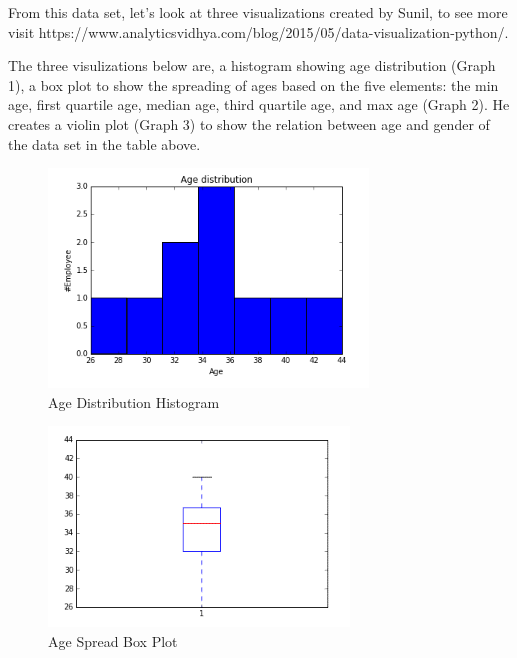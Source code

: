 \documentclass[sigconf]{acmart}
\begin{document}
From this data set, let’s look at three visualizations created by Sunil, to see more visit https://www.analyticsvidhya.com/blog/2015/05/data-visualization-python/.  

The three visulizations below are, a histogram showing age distribution (Graph 1), a box plot to show the spreading of ages based on the five elements: the min age, first quartile age, median age, third quartile age, and max age (Graph 2). He creates a violin plot (Graph 3) to show the relation between age and gender of the data set in the table above.

\begin{figure}[htb]
  \centering
  \includegraphics[width=1.0\columnwidth]{paper2/Graph 1.png}
  \caption{Age Distribution Histogram
  \cite{Sunil Ray }}
  \label{fig:Graph 1} 
\end{figure}

\begin{figure}[htb]
  \centering
  \includegraphics[width=1.0\columnwidth]{paper2/Graph 2.png}
  \caption{Age Spread Box Plot
  \cite{Sunil Ray }}
  \label{fig:Graph 2} 
\end{figure}
\end{document}
